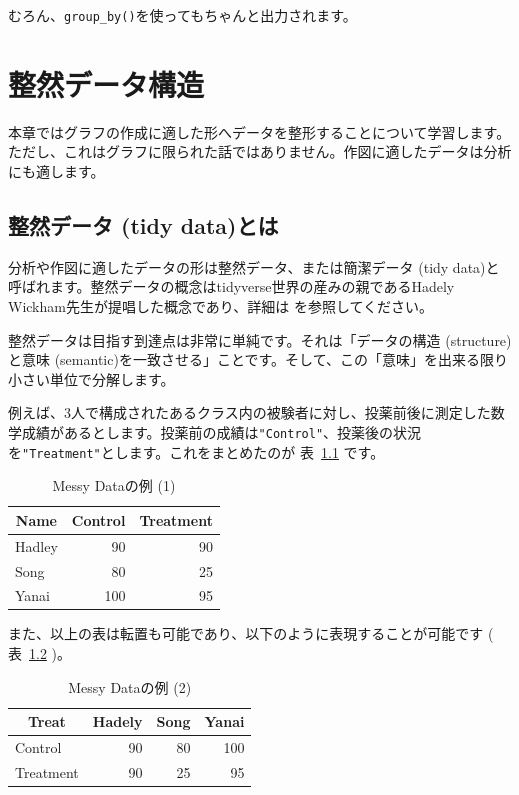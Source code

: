 \documentclass[
  a4paper,
  pandoc,
  ja=standard,
  jafont=haranoaji]{bxjsbook}
\begin{document}
むろん、\texttt{group\_by()}を使ってもちゃんと出力されます。

\hypertarget{sec-tidydata}{%
\chapter{整然データ構造}\label{sec-tidydata}}

本章ではグラフの作成に適した形へデータを整形することについて学習します。ただし、これはグラフに限られた話ではありません。作図に適したデータは分析にも適します。

\hypertarget{sec-tidydata_intro}{%
\section{整然データ (tidy data)とは}\label{sec-tidydata_intro}}

分析や作図に適したデータの形は整然データ、または簡潔データ (tidy
data)と呼ばれます。整然データの概念はtidyverse世界の産みの親であるHadely
Wickham先生が提唱した概念であり、詳細は \citet{Wickham:2014}
を参照してください。

整然データは目指す到達点は非常に単純です。それは「データの構造
(structure)と意味
(semantic)を一致させる」ことです。そして、この「意味」を出来る限り小さい単位で分解します。

例えば、3人で構成されたあるクラス内の被験者に対し、投薬前後に測定した数学成績があるとします。投薬前の成績は\texttt{"Control"}、投薬後の状況を\texttt{"Treatment"}とします。これをまとめたのが
表~\ref{tbl-tidydata_messy_data1} です。

\hypertarget{tbl-tidydata_messy_data1}{}
\begin{table}
\caption{\label{tbl-tidydata_messy_data1}Messy Dataの例 (1) }

\centering
\begin{tabular}{lrr}
\toprule
\multicolumn{1}{c}{Name} & \multicolumn{1}{c}{Control} & \multicolumn{1}{c}{Treatment}\\
\midrule
Hadley & 90 & 90\\
Song & 80 & 25\\
Yanai & 100 & 95\\
\bottomrule
\end{tabular}
\end{table}

また、以上の表は転置も可能であり、以下のように表現することが可能です (
表~\ref{tbl-tidydata_messy_data2} )。

\hypertarget{tbl-tidydata_messy_data2}{}
\begin{table}
\caption{\label{tbl-tidydata_messy_data2}Messy Dataの例 (2) }

\centering
\begin{tabular}{lrrr}
\toprule
\multicolumn{1}{c}{Treat} & \multicolumn{1}{c}{Hadely} & \multicolumn{1}{c}{Song} & \multicolumn{1}{c}{Yanai}\\
\midrule
Control & 90 & 80 & 100\\
Treatment & 90 & 25 & 95\\
\bottomrule
\end{tabular}
\end{table}
\end{document}
